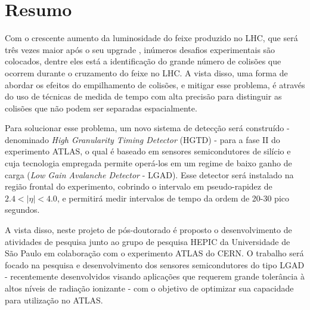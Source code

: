 \chapter*{Resumo}


Com o crescente aumento da luminosidade do feixe produzido no LHC, que será três vezes maior após o seu upgrade \cite{HL_LHC,tdr}, inúmeros desafios experimentais são colocados, dentre eles está a identificação do grande número de colisões que ocorrem durante o cruzamento do feixe no LHC. A vista disso, uma forma de abordar os efeitos do empilhamento de colisões, e mitigar esse problema, é através do uso de técnicas de medida de tempo com alta precisão para distinguir as colisões que não podem ser separadas espacialmente. 

Para solucionar esse problema, um novo sistema de detecção será construído - denominado {\it High Granularity Timing Detector} (HGTD) - para a fase II do experimento ATLAS, o qual é baseado em sensores semicondutores de silício e cuja tecnologia empregada permite operá-los em um regime de baixo ganho de carga ({\it Low Gain Avalanche Detector} - LGAD). Esse detector será instalado na região frontal do experimento, cobrindo o intervalo em pseudo-rapidez de $2.4< |\eta| <4.0$, e permitirá medir intervalos de tempo da ordem de 20-30 pico segundos.


A vista disso, neste projeto de pós-doutorado é proposto o desenvolvimento de atividades de pesquisa junto ao grupo de pesquisa HEPIC da Universidade de São Paulo em colaboração com o experimento ATLAS do CERN. O trabalho será focado na pesquisa e desenvolvimento dos sensores semicondutores do tipo LGAD - recentemente desenvolvidos visando aplicações que requerem grande tolerância à altos níveis de radiação ionizante \cite{JIN_LGAD,NIMA_LGAD,NIMA_LGAD_I,NIMA_LGAD_II,NIMA_LGAD_III} - com o objetivo de optimizar sua capacidade para utilização no ATLAS. %

